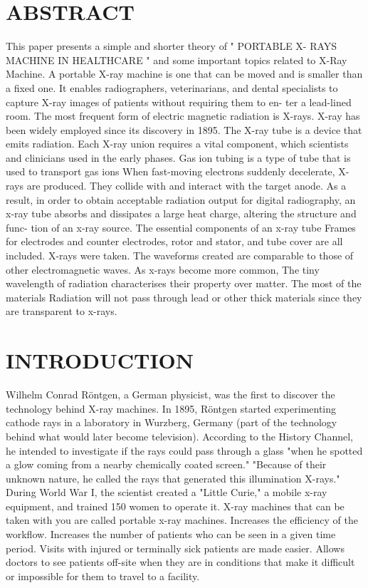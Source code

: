 \documentclass[12pt]{article}
\begin{document}
\tableofcontents
\clearpage
\section*{ABSTRACT}
This paper presents a simple and shorter theory of " PORTABLE X- RAYS MACHINE IN HEALTHCARE " and some important topics related to X-Ray Machine. A portable X-ray machine is one that can be moved and is
smaller than a fixed one. It enables radiographers, veterinarians, and dental
specialists to capture X-ray images of patients without requiring them to en-
ter a lead-lined room. The most frequent form of electric magnetic radiation
is X-rays. X-ray has been widely employed since its
discovery in 1895. The X-ray tube is a device that emits radiation. Each X-ray
union requires a vital component, which scientists and clinicians used in the
early phases. Gas ion tubing is a type of tube that is used to transport gas
ions When fast-moving electrons suddenly decelerate, X-rays are produced.
They collide with and interact with the target anode. As a result, in order
to obtain acceptable radiation output for digital radiography, an x-ray tube
absorbs and dissipates a large heat charge, altering the structure and func-
tion of an x-ray source. The essential components of an x-ray tube Frames
for electrodes and counter electrodes, rotor and stator, and tube cover are
all included. X-rays were taken. The waveforms created are comparable to
those of other electromagnetic waves. As x-rays become more common, The
tiny wavelength of radiation characterises their property over matter. The
most of the materials Radiation will not pass through lead or other thick
materials since they are transparent to x-rays.

\clearpage


\section{INTRODUCTION}
Wilhelm Conrad Röntgen, a German physicist, was the first to discover the technology behind X-ray machines. In 1895, Röntgen started experimenting cathode rays in a laboratory in Wurzberg, Germany (part of the technology behind what would later become television). According to the History Channel, he intended to investigate if the rays could pass through a glass "when he spotted a glow coming from a nearby chemically coated screen." "Because of their unknown nature, he called the rays that generated this illumination X-rays."
\\
During World War I, the scientist created a "Little Curie," a mobile x-ray equipment, and trained 150 women to operate it. X-ray machines that can be taken with you are called portable x-ray machines. Increases the efficiency of the workflow. Increases the number of patients who can be seen in a given time period. Visits with injured or terminally sick patients are made easier. Allows doctors to see patients off-site when they are in conditions that make it difficult or impossible for them to travel to a facility.
\end{document}
